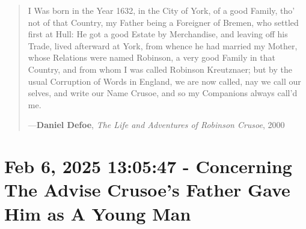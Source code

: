 \documentclass[a4paper]{article}
\begin{document}
\noindent
\begin{minipage}{1\textwidth}
\vspace{1em}
\begin{quotation}
{\ttfamily

I Was born in the Year 1632, in the City of York, of a good Family, tho’ not of that Country, my Father being a Foreigner of Bremen, who settled first at Hull: He got a good Estate by Merchandise, and leaving off his Trade, lived afterward at York, from whence he had married my Mother, whose Relations were named Robinson, a very good Family in that Country, and from whom I was called Robinson Kreutznaer; but by the usual Corruption of Words in England, we are now called, nay we call our selves, and write our Name Crusoe, and so my Companions always call’d me.

}
\hspace*{\fill} ---\textbf{Daniel Defoe}, \textit{The Life and Adventures of Robinson Crusoe}, 2000\cite{Defoe2007}
\end{quotation}
\vspace{1em}
\end{minipage}




\section{Feb 6, 2025 13:05:47 - Concerning The Advise Crusoe's Father Gave Him as A Young Man}
\label{SEC4}
\end{document}
